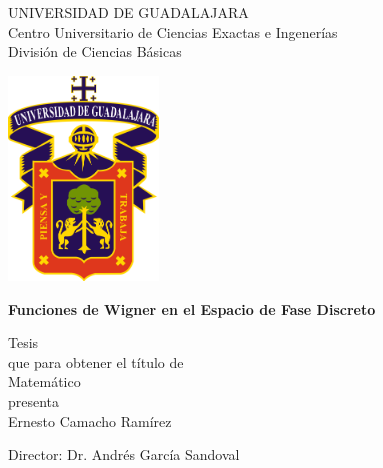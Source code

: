 \documentclass[a4paper,11pt]{report}
\begin{document}
  \begin{titlepage}
    \begin{center}
      \vspace{1.0in}

      \huge
      UNIVERSIDAD DE GUADALAJARA\\
      \vspace{0.2cm}
      \Large{Centro Universitario de Ciencias Exactas e
        Ingenerías} \\
      \vspace{0.2cm}
      División de Ciencias Básicas\\

      \vspace{0.5in}

      \includegraphics[width=0.3\textwidth]{imgs/udg}
      
      \vspace{0.5in}

      \huge
      \textbf{
        Funciones de Wigner en el Espacio de Fase Discreto
      }

      \large
      \vspace{1.0in}
      
      Tesis \\
      que para obtener el título de \\
      \vspace{0.2cm}
      \Large{Matemático} \\
      \vspace{0.2cm}
      presenta \\
      \vspace{0.2cm}
      \Large{Ernesto Camacho Ramírez} \\
      
      \vfill

      \large{Director: Dr. Andrés García Sandoval} \\
     \end{center}
  \end{titlepage}
\end{document}
